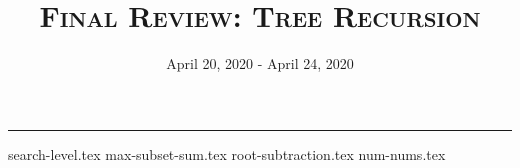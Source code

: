 \documentclass{exam}
\title{\textsc{Final Review: Tree Recursion}}
\date{April 20, 2020 - April 24, 2020}
\begin{document}
\maketitle\rule{\textwidth}{0.15em}
\fontsize{12}{15}\selectfont

\begin{questions}
{search-level.tex}
{max-subset-sum.tex}
\newpage
{root-subtraction.tex}
\newpage
{num-nums.tex}
\end{questions}
\end{document}
